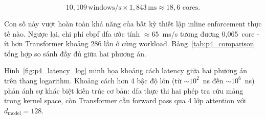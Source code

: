 \documentclass[../main.tex]{subfiles}
\begin{document}
\begin{equation}
  \label{eq:p4_cores}
  10{,}109\,\text{windows/s} \times 1{,}843\,\text{ms} \approx 18{,}6
  \text{ cores}.
\end{equation}

Con số này vượt hoàn toàn khả năng của bất kỳ thiết lập inline
enforcement thực tế nào. Ngược lại, chi phí \gls{ebpf} \gls{dfa} ước tính
$\approx 65$~ms/s tương đương 0,065~core - ít hơn Transformer khoảng
286 lần ở cùng workload. Bảng~\ref{tab:p4_comparison} tổng hợp so sánh
đầy đủ giữa hai phương án.

\begin{table}[h!]
  \caption{So sánh latency và chi phí CPU giữa DFA (eBPF) và Transformer
  (CPU inline) tại 647k~syscalls/s.}
  \label{tab:p4_comparison}
  \centering
\end{table}

Hình~\ref{fig:p4_latency_log} minh họa khoảng cách latency giữa hai
phương án trên thang logarithm. Khoảng cách hơn 4 bậc độ lớn (từ
$\sim$$10^2$~ns đến $\sim$$10^6$~ns) phản ánh sự khác biệt kiến trúc
cơ bản: \gls{dfa} thực thi hai phép tra cứu mảng trong kernel space, còn
Transformer cần forward pass qua 4 lớp attention với $d_{\text{model}}=128$.
\end{document}
